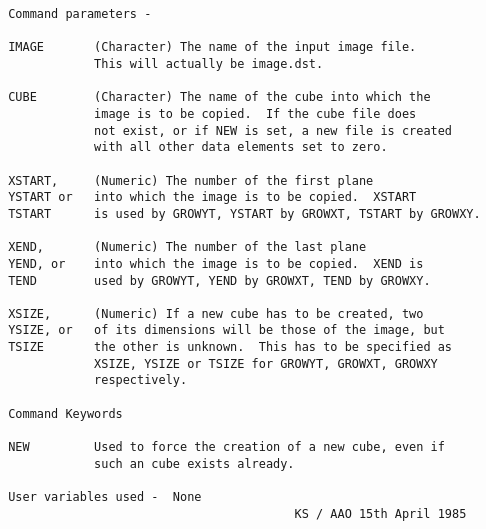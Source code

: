 \begin{description}
\begin{verbatim}
 Command parameters -

 IMAGE       (Character) The name of the input image file.
             This will actually be image.dst.

 CUBE        (Character) The name of the cube into which the
             image is to be copied.  If the cube file does
             not exist, or if NEW is set, a new file is created
             with all other data elements set to zero.

 XSTART,     (Numeric) The number of the first plane
 YSTART or   into which the image is to be copied.  XSTART
 TSTART      is used by GROWYT, YSTART by GROWXT, TSTART by GROWXY.

 XEND,       (Numeric) The number of the last plane
 YEND, or    into which the image is to be copied.  XEND is
 TEND        used by GROWYT, YEND by GROWXT, TEND by GROWXY.

 XSIZE,      (Numeric) If a new cube has to be created, two
 YSIZE, or   of its dimensions will be those of the image, but
 TSIZE       the other is unknown.  This has to be specified as
             XSIZE, YSIZE or TSIZE for GROWYT, GROWXT, GROWXY
             respectively.

 Command Keywords

 NEW         Used to force the creation of a new cube, even if
             such an cube exists already.

 User variables used -  None
                                         KS / AAO 15th April 1985
\end{verbatim}
\end{description}

